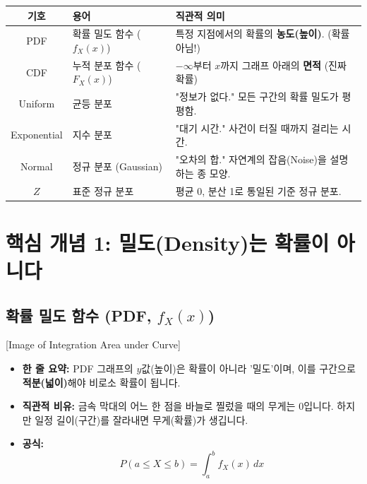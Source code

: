 \documentclass[11pt,a4paper]{book}
\theoremstyle{definition}
\begin{document}
\begin{center}
\begin{tabular}{|c|l|l|}
\hline
\rowcolor{mainblue!20} \textbf{기호} & \textbf{용어} & \textbf{직관적 의미} \\ \hline
PDF & 확률 밀도 함수 ($f_X(x)$) & 특정 지점에서의 확률의 \textbf{농도(높이)}. (확률 아님!) \\ \hline
CDF & 누적 분포 함수 ($F_X(x)$) & $-\infty$부터 $x$까지 그래프 아래의 \textbf{면적} (진짜 확률) \\ \hline
Uniform & 균등 분포 & "정보가 없다." 모든 구간의 확률 밀도가 평평함. \\ \hline
Exponential & 지수 분포 & "대기 시간." 사건이 터질 때까지 걸리는 시간. \\ \hline
Normal & 정규 분포 (Gaussian) & "오차의 합." 자연계의 잡음(Noise)을 설명하는 종 모양. \\ \hline
$Z$ & 표준 정규 분포 & 평균 0, 분산 1로 통일된 기준 정규 분포. \\ \hline
\end{tabular}
\end{center}

\section{핵심 개념 1: 밀도(Density)는 확률이 아니다}

\subsection{확률 밀도 함수 (PDF, $f_X(x)$)}
[Image of Integration Area under Curve]

\begin{conceptbox}[title={높이가 아니라 '면적'이 확률이다}]
\begin{itemize}
    \item \textbf{한 줄 요약:} PDF 그래프의 $y$값(높이)은 확률이 아니라 '밀도'이며, 이를 구간으로 \textbf{적분(넓이)}해야 비로소 확률이 됩니다.
    \item \textbf{직관적 비유:} 금속 막대의 어느 한 점을 바늘로 찔렀을 때의 무게는 0입니다. 하지만 일정 길이(구간)를 잘라내면 무게(확률)가 생깁니다.
    \item \textbf{공식:}
    \[ P(a \le X \le b) = \int_{a}^{b} f_X(x) \, dx \]
\end{itemize}
\end{conceptbox}
\end{document}
